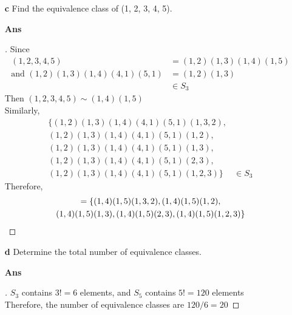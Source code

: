 \documentclass[paper=usletter, fontsize=12pt]{article}
\begin{document}
\begin{itemize}
\begin{itemize}
\begin{itemize}
                \item[\textbf{c}] Find the equivalence class of (1, 2, 3, 4, 5).
                \item[\textbf{Ans}]
                \begin{proof}[\unskip\nopunct]
                    Since
                    \begin{align*}
                        (1,2,3,4,5) & = (1,2)(1,3)(1,4)(1,5)\\
                        \text{and } (1,2)(1,3)(1,4)(4,1)(5,1) & = (1,2)(1,3)\\
                        & \in S_3
                    \end{align*}
                    Then $(1,2,3,4,5) \sim (1,4)(1,5)$\\
                    Similarly,
                    \begin{align*}
                        \{(1,2)(1,3)(1,4)(4,1)(5,1)(1,3,2), & \\
                        (1,2)(1,3)(1,4)(4,1)(5,1)(1,2), & \\
                        (1,2)(1,3)(1,4)(4,1)(5,1)(1,3), & \\
                        (1,2)(1,3)(1,4)(4,1)(5,1)(2,3), & \\
                        (1,2)(1,3)(1,4)(4,1)(5,1)(1,2,3)\} & \in S_3
                    \end{align*}
                    Therefore,
                    \begin{multline*}
                        [(1,2,3,4,5)] = \{(1,4)(1,5)(1,3,2),
                        (1,4)(1,5)(1,2),\\(1,4)(1,5)(1,3), (1,4)(1,5)(2,3),
                        (1,4)(1,5)(1,2,3)\} \qedhere
                    \end{multline*}
                \end{proof}
                \vspace{0.2in}

                \item[\textbf{d}] Determine the total number of equivalence
                classes.
                \item[\textbf{Ans}]
                \begin{proof}[\unskip\nopunct]
                    $S_3$ contains $3!=6$ elements, and $S_5$ contains $5!=120$
                    elements\\ Therefore, the number of equivalence classes are
                    $120/6=20$ \qedhere
                \end{proof}
                \vspace{0.2in}

            \end{itemize}

        \end{itemize}

    \end{itemize}
\end{document}

